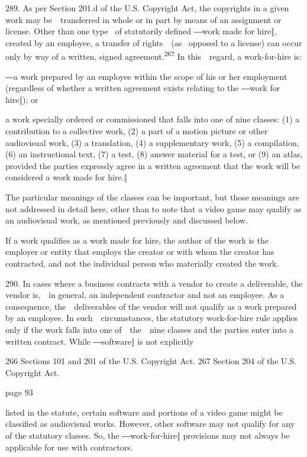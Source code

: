 \documentclass[
]{article}
\begin{document}
{289. }{As per Section 201.d of the U.S. }{Copyright Act}{, the
copyrights in a given work may be~~transferred in whole or in part by
means of an assignment or license. Other than one type }{~of statutorily
defined ―}{work made for hire}{‖, created by an employee, a transfer of
rights~~(as }{~opposed to a license) can occur only by way of a written,
signed agreement.}\textsuperscript{{267 }}{In this~~regard, a
work-for-hire is:}

{―a work prepared by an employee within the scope of his or her
}{employment (regardless of whether a written agreement exists relating
}{to the ―work for hire‖); or}

{a work specially ordered or commissioned that falls into one of nine
classes: (1) a contribution to a collective work, (2) a part of a motion
picture or other audiovisual work, (3) a translation, (4) a
supplementary work, (5) a compilation, (6) an instructional text, (7) a
test, (8) answer material for a test, or (9) an atlas, provided the
parties expressly agree in a written agreement that the work will be
considered a work made for }{hire.‖}

{The particular meanings of the classes can be important, but those
meanings are not addressed in detail here, other than to note that a
video game may qualify as an audiovisual work, as mentioned previously
and discussed below.}

{If a work qualifies as a work made for hire, the author of the work is
the employer or entity that employs the creator or with whom the creator
has contracted, and not the individual person who materially created the
work.}

{290. }{In cases where a business contracts with a vendor to create a
deliverable, the vendor is,~~in general, an independent contractor and
not an employee. As a consequence, the~~deliverables of the vendor will
not qualify as a work prepared by an employee. In such~~circumstances,
the statutory work-for-hire rule applies only if the work falls into one
of~~the~~nine classes and the parties enter into a written contract.
}{While ―software‖ is not explicitly}

{266 }{Sections 101 and 201 of the U.S. }{Copyright Act}{. }{267
}{Section 204 of the U.S. }{Copyright Act}{.}

{page 93}

{listed in the statute, certain software and portions of a video game
might be classified as audiovisual works. However, other software may
not qualify for any of the statutory classes. }{So, the
―work}{-for-}{hire‖ provisions may not always be applicable for use with
}{contractors.}
\end{document}
